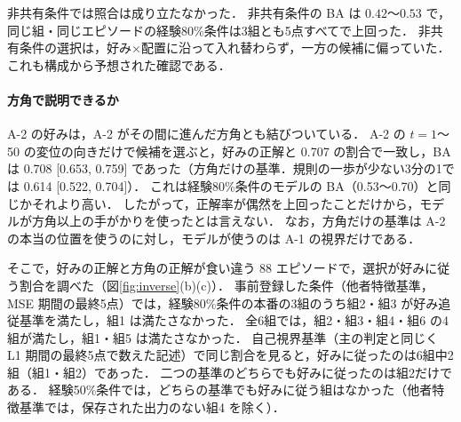 非共有条件では照合は成り立たなかった．
非共有条件の BA は $0.42$〜$0.53$ で，同じ組・同じエピソードの経験80\%条件は3組とも5点すべてで上回った．
非共有条件の選択は，好み×配置に沿って入れ替わらず，一方の候補に偏っていた．
これも構成から予想された確認である．

\paragraph{方角で説明できるか}
A-2 の好みは，A-2 がその間に進んだ方角とも結びついている．
A-2 の $t=1$〜50 の変位の向きだけで候補を選ぶと，好みの正解と 0.707 の割合で一致し，BA は 0.708 [0.653, 0.759] であった（方角だけの基準．規則の一歩が少ない3分の1では 0.614 [0.522, 0.704]）．
これは経験80\%条件のモデルの BA（0.53〜0.70）と同じかそれより高い．
したがって，正解率が偶然を上回ったことだけから，モデルが方角以上の手がかりを使ったとは言えない．
なお，方角だけの基準は A-2 の本当の位置を使うのに対し，モデルが使うのは A-1 の視界だけである．

そこで，好みの正解と方角の正解が食い違う 88 エピソードで，選択が好みに従う割合を調べた（図\ref{fig:inverse}(b)(c)）．
事前登録した条件（他者特徴基準，MSE 期間の最終5点）では，経験80\%条件の本番の3組のうち組2・組3 が好み追従基準を満たし，組1 は満たさなかった．
全6組では，組2・組3・組4・組6 の4組が満たし，組1・組5 は満たさなかった．
自己視界基準（主の判定と同じく L1 期間の最終5点で数えた記述）で同じ割合を見ると，好みに従ったのは6組中2組（組1・組2）であった．
二つの基準のどちらでも好みに従ったのは組2だけである．
経験50\%条件では，どちらの基準でも好みに従う組はなかった（他者特徴基準では，保存された出力のない組4 を除く）．

